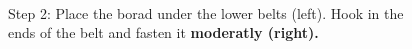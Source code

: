 \begin{figure}[!ht]
\centering
\mbox{\quad
{}}
\caption{Step 2: Place the borad under the lower belts (left). Hook in the ends of the belt and fasten it \bf{moderatly} (right).} %
\end{figure}

